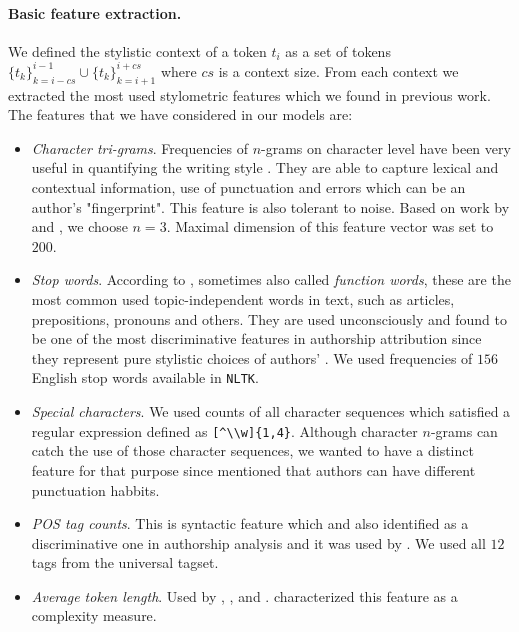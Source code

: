 \documentclass[10pt, a4paper]{article}
\begin{document}
\paragraph{Basic feature extraction.} 
We defined the stylistic context of a token $t_i$ as a set of tokens $\{t_k\}_{k=i-cs}^{i-1} \cup \{t_k\}_{k=i+1}^{i+cs}$ where $cs$ is a context size. From each context we extracted the most used stylometric features which we found in previous work. The features that we have considered in our models are:
\begin{itemize}
	\item \textit{Character tri-grams}. Frequencies of $n$-grams on character level have been very useful in quantifying the writing style \citep{stamatatos-2009b}. They are able to capture lexical and contextual information, use of punctuation and errors which can be an author's "fingerprint". This feature is also tolerant to noise. Based on work by \citet{stamatatos-2009a} and \citet{rahman-2015}, we choose $n=3$. Maximal dimension of this feature vector was set to $200$.
	\item \textit{Stop words}. According to \citet{stamatatos-2009a}, sometimes also called \textit{function words}, these are the most common used topic-independent words in text, such as articles, prepositions, pronouns and others. They are used unconsciously and found to be one of the most discriminative features in authorship attribution since they represent pure stylistic choices of authors' \citep{burrows-1987,argamon-2005}. We used frequencies of $156$ English stop words available in \texttt{NLTK}.
	\item \textit{Special characters}. We used counts of all character sequences which satisfied a regular expression defined as \verb/[^\\w]{1,4}/. Although character $n$-grams can catch the use of those character sequences, we wanted to have a distinct feature for that purpose since \citet{koppel-2009} mentioned that authors can have different punctuation habbits.
	\item \textit{POS tag counts}. This is syntactic feature which \citet{koppel-2009} and \citet{stamatatos-2009a} also identified as a discriminative one in authorship analysis and it was used by \citet{kuznetsov-2016}. We used all $12$ tags from the universal tagset.
	\item \textit{Average token length}. Used by \citet{kuznetsov-2016}, \citet{sittar-2016},  \citet{brooke-2012} and \citet{stein-2011}. \citet{koppel-2009} characterized this feature as a complexity measure.

\end{itemize}
\end{document}
